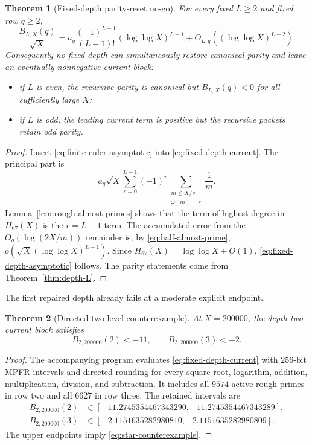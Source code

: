 \documentclass[11pt]{article}
\newtheorem{theorem}{Theorem}[section]
\newcommand{\1}{\mathbf 1}
\begin{document}
\begin{theorem}[Fixed-depth parity-reset no-go]
\label{thm:fixed-depth-no-go}
For every fixed $L\ge2$ and fixed row $q\ge2$,
\begin{equation}
 \frac{B_{L,X}(q)}{\sqrt X}
 =a_q\frac{(-1)^{L-1}}{(L-1)!}
  (\log\log X)^{L-1}
 +O_{L,q}((\log\log X)^{L-2}).
 \label{eq:fixed-depth-asymptotic}
\end{equation}
Consequently no fixed depth can simultaneously restore canonical parity and
leave an eventually nonnegative current block:
\begin{itemize}
\item if $L$ is even, the recursive parity is canonical but
$B_{L,X}(q)<0$ for all sufficiently large $X$;
\item if $L$ is odd, the leading current term is positive but the recursive
packets retain odd parity.
\end{itemize}
\end{theorem}

\begin{proof}
Insert \eqref{eq:finite-euler-asymptotic} into
\eqref{eq:fixed-depth-current}.  The principal part is
\[
 a_q\sqrt X
 \sum_{r=0}^{L-1}(-1)^r
 \sum_{\substack{m\le X/q\\\omega(m)=r}}
 \frac1m.
\]
Lemma~\ref{lem:rough-almost-primes} shows that the term of highest degree in
$H_{67}(X)$ is the $r=L-1$ term.  The accumulated error from the
$O_q(\log(2X/m))$ remainder is, by
\eqref{eq:half-almost-prime},
$o(\sqrt X(\log\log X)^{L-1})$.  Since
$H_{67}(X)=\log\log X+O(1)$, \eqref{eq:fixed-depth-asymptotic} follows.
The parity statements come from Theorem~\ref{thm:depth-L}.
\end{proof}

The first repaired depth already fails at a moderate explicit endpoint.

\begin{theorem}[Directed two-level counterexample]
\label{thm:star-counterexample}
At $X=200000$, the depth-two current block satisfies
\begin{equation}
 B_{2,200000}(2)<-11,
 \qquad
 B_{2,200000}(3)<-2.
 \label{eq:star-counterexample}
\end{equation}
\end{theorem}

\begin{proof}
The accompanying program evaluates \eqref{eq:fixed-depth-current} with
$256$-bit MPFR intervals and directed rounding for every square root, logarithm,
addition, multiplication, division, and subtraction.  It includes all $9574$
active rough primes in row two and all $6627$ in row three.  The retained
intervals are
\begin{align*}
B_{2,200000}(2)&\in[-11.2745354467343290,-11.2745354467343289],\\
B_{2,200000}(3)&\in[-2.1151635282980810,-2.1151635282980809].
\end{align*}
The upper endpoints imply \eqref{eq:star-counterexample}.
\end{proof}
\end{document}
